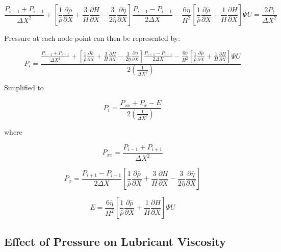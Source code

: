 \begin{equation}\label{eq3.18}
	\frac{P_{i-1}+P_{i+1}}{\Delta X^2}+\left[\frac{1}{\bar{\rho}} \frac{\partial \bar{\rho}}{\partial X}+\frac{3}{H} \frac{\partial H}{\partial X}-\frac{3}{2 \bar{\eta}} \frac{\partial \bar{\eta}}{\partial X}\right] \frac{P_{i+1}-P_{i-1}}{2 \Delta X}-\frac{6 \bar{\eta}}{H^2}\left[\frac{1}{\bar{\rho}} \frac{\partial \bar{\rho}}{\partial X}+\frac{1}{H} \frac{\partial H}{\partial X}\right] \Psi U=\frac{2 P_i}{\Delta X^2}
\end{equation}

Pressure at each node point can then be represented by:

\begin{equation}\label{eq3.19}
	P_i=\frac{\frac{P_{i-1}+P_{i+1}}{\Delta X^2}+\left[\frac{1}{\bar{\rho}} \frac{\partial \bar{\rho}}{\partial X}+\frac{3}{H} \frac{\partial H}{\partial X}-\frac{3}{2 \bar{\eta}} \frac{\partial \bar{\eta}}{\partial X}\right] \frac{P_{i+1}-P_{i-1}}{2 \Delta X}-\frac{6 \bar{\eta}}{H^2}\left[\frac{1}{\bar{\rho}} \frac{\partial \bar{\rho}}{\partial X}+\frac{1}{H} \frac{\partial H}{\partial X}\right] \Psi U}{2\left(\frac{1}{\Delta X^2}\right)}
\end{equation}

Simplified to 

\begin{equation}\label{eq3.20}
	P_i=\frac{P_{x x}+P_x-E}{2\left(\frac{1}{\Delta X^2}\right)}
\end{equation}

where

\begin{equation}\label{eq3.21}
	P_{x x}=\frac{P_{i-1}+P_{i+1}}{\Delta X^2}
\end{equation}

\begin{equation}\label{eq3.22}
	P_{x}=\frac{P_{i+1}-P_{i-1}}{2 \Delta X}\left[\frac{1}{\bar{\rho}} \frac{\partial \bar{\rho}}{\partial X}+\frac{3}{H} \frac{\partial H}{\partial X}-\frac{3}{2 \bar{\eta}} \frac{\partial \bar{\eta}}{\partial X}\right]
\end{equation}

\begin{equation}\label{eq3.23}
	E=\frac{6 \bar{\eta}}{H^2}\left[\frac{1}{\bar{\rho}} \frac{\partial \bar{\rho}}{\partial X}+\frac{1}{H} \frac{\partial H}{\partial X}\right] \Psi U
\end{equation}

\subsection{Effect of Pressure on Lubricant Viscosity}


